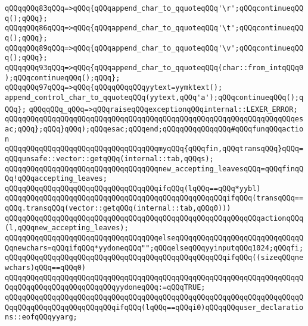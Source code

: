 \verb|qQQqqQQq83qQQq=>qQQq{qQQqappend_char_to_qquoteqQQq'\r';qQQqcontinueqQQq();qQQq};|\newline
\verb|qQQqqQQq86qQQq=>qQQq{qQQqappend_char_to_qquoteqQQq'\t';qQQqcontinueqQQq();qQQq};|\newline
\verb|qQQqqQQq89qQQq=>qQQq{qQQqappend_char_to_qquoteqQQq'\v';qQQqcontinueqQQq();qQQq};|\newline
\verb|qQQqqQQq93qQQq=>qQQq{qQQqappend_char_to_qquoteqQQq(char::from_intqQQq0);qQQqcontinueqQQq();qQQq};|\newline
\verb|qQQqqQQq97qQQq=>qQQq{qQQqqQQqqQQqyytext=yymktext();|\newline
\verb|append_control_char_to_qquoteqQQq(yytext,qQQq'a');qQQqcontinueqQQq();qQQq};|\newline
\verb|qQQqqQQq_qQQq=>qQQqraiseqQQqexceptionqQQqinternal::LEXER_ERROR;|\newline
\newline
\verb|qQQqqQQqqQQqqQQqqQQqqQQqqQQqqQQqqQQqqQQqqQQqqQQqqQQqqQQqqQQqqQQqqQQqesac;qQQq};qQQq}qQQq);qQQqesac;qQQqend;qQQqqQQqqQQqqQQq#qQQqfunqQQqaction|\newline
\newline
\verb|qQQqqQQqqQQqqQQqqQQqqQQqqQQqqQQqqQQqmyqQQq{qQQqfin,qQQqtransqQQq}qQQq=qQQqunsafe::vector::getqQQq(internal::tab,qQQqs);|\newline
\verb|qQQqqQQqqQQqqQQqqQQqqQQqqQQqqQQqqQQqnew_accepting_leavesqQQq=qQQqfinqQQq!qQQqaccepting_leaves;|\newline
\verb|qQQqqQQqqQQqqQQqqQQqqQQqqQQqqQQqqQQqifqQQq(lqQQq==qQQq*yybl)|\newline
\verb|qQQqqQQqqQQqqQQqqQQqqQQqqQQqqQQqqQQqqQQqqQQqqQQqqQQqifqQQq(transqQQq==qQQq.transqQQq(vector::getqQQq(internal::tab,qQQq0)))|\newline
\verb|qQQqqQQqqQQqqQQqqQQqqQQqqQQqqQQqqQQqqQQqqQQqqQQqqQQqqQQqqQQqactionqQQq(l,qQQqnew_accepting_leaves);|\newline
\verb|qQQqqQQqqQQqqQQqqQQqqQQqqQQqqQQqqQQqelseqQQqqQQqqQQqqQQqqQQqqQQqqQQqqQQqnewchars=qQQqifqQQq*yydoneqQQq"";qQQqelseqQQqyyinputqQQq1024;qQQqfi;|\newline
\verb|qQQqqQQqqQQqqQQqqQQqqQQqqQQqqQQqqQQqqQQqqQQqqQQqqQQqifqQQq((sizeqQQqnewchars)qQQq==qQQq0)|\newline
\verb|qQQqqQQqqQQqqQQqqQQqqQQqqQQqqQQqqQQqqQQqqQQqqQQqqQQqqQQqqQQqqQQqqQQqqQQqqQQqqQQqqQQqqQQqqQQqqQQqyydoneqQQq:=qQQqTRUE;|\newline
\verb|qQQqqQQqqQQqqQQqqQQqqQQqqQQqqQQqqQQqqQQqqQQqqQQqqQQqqQQqqQQqqQQqqQQqqQQqqQQqqQQqqQQqqQQqqQQqqQQqifqQQq(lqQQq==qQQqi0)qQQqqQQquser_declarations::eofqQQqyyarg;|\newline
